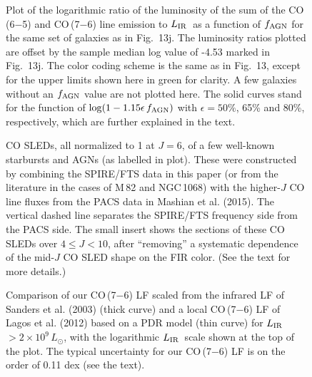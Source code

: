 \documentclass[preprint]{aastex}
\newcommand{\LIR}{\mbox{$L_{\rm IR}$}}
\begin{document}
\begin{figure}
\centering
{}
\caption{
Plot of the logarithmic ratio of the luminosity of the sum of the CO\,(6$-$5) and CO\,(7$-$6) line emission to 
\LIR\ as a function of $f_{\rm AGN}$ for the same set of galaxies as in Fig.~13j. The luminosity ratios plotted 
are offset by the sample median log value of -4.53 marked in Fig.~13j. 
The color coding scheme is the same as in Fig.~13, except for the upper limits shown here in green for clarity.
A few galaxies without an $f_{\rm AGN}$ value are not plotted here.  The solid curves stand for the function 
of $\log(1 - 1.15\epsilon\,f_{\rm AGN})$ with $\epsilon = 50\%$, 65\% and 80\%, respectively, which are further 
explained in the text.
}
\label{Fig14}
\end{figure}
\clearpage






\begin{figure}
\centering
\caption{
CO SLEDs, all normalized to 1 at $J = 6$, of a few well-known starbursts and AGNs (as labelled in
plot). These were constructed by combining the SPIRE/FTS data in this paper (or from 
the literature in the cases of M\,82 and NGC\,1068) with the higher-$J$ CO line fluxes from 
the PACS data in Mashian et al. (2015).  The vertical dashed line separates the SPIRE/FTS 
frequency side from the PACS side.  The small insert shows the sections of these CO SLEDs over 
$4 \leqslant J < 10$, after ``removing'' a systematic dependence of the mid-$J$ CO SLED shape
on the FIR color. (See the text for more details.)
}
\label{Fig15}
\end{figure}
\clearpage




\begin{figure}
\centering
\vspace{-2.0in}
\caption{
Comparison of our CO\,(7$-$6) LF scaled from the infrared LF of Sanders et al. (2003) (thick curve)
and a local CO\,(7$-$6) LF of Lagos et al. (2012) based on a PDR model (thin curve) for \LIR\ $> 2 
\times 10^9\,L_{\odot}$, with the logarithmic \LIR\ scale shown at the top of the plot. 
The typical uncertainty for our CO\,(7$-$6) LF is on the order of 0.11 dex (see the text).
}
\label{Fig16}
\end{figure}
\clearpage
\end{document}

